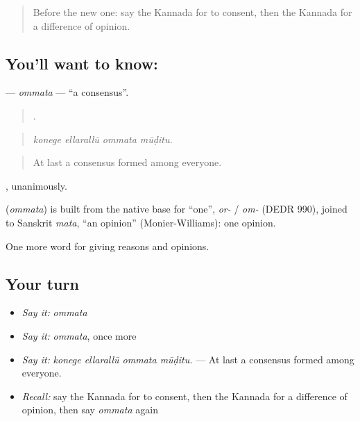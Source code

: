 \label{lesson:KA-C379-ommata}



\begin{quote}
Before the new one: say the Kannada for to consent, then the Kannada for a difference of opinion.
\end{quote}

\subsection*{You'll want to know: }
\textbf{} — \emph{ommata} — \textquotedblleft{}a consensus\textquotedblright{}.

\begin{quote}
   .
\end{quote}

\begin{quote}
\emph{konege ellarallū ommata mūḍitu.}
\end{quote}

\begin{quote}
At last a consensus formed among everyone.
\end{quote}

, unanimously.

\begin{cousinweb}
\textbf{} (\emph{ommata}) is built from the native base for \textquotedblleft{}one\textquotedblright{}, \emph{or-} / \emph{om-} (DEDR 990), joined to Sanskrit \emph{mata}, \textquotedblleft{}an opinion\textquotedblright{} (Monier-Williams): one opinion.
\end{cousinweb}

\begin{grammarlens}[title={What you've built}]
One more word for giving reasons and opinions.
\end{grammarlens}

\subsection*{Your turn}
\begin{itemize}
\raggedright
  \item \emph{Say it:} \emph{ommata}
  \item \emph{Say it:} \emph{ommata}, once more
  \item \emph{Say it:} \emph{konege ellarallū ommata mūḍitu.} — At last a consensus formed among everyone.
  \item \emph{Recall:} say the Kannada for to consent, then the Kannada for a difference of opinion, then say \emph{ommata} again
\end{itemize}

